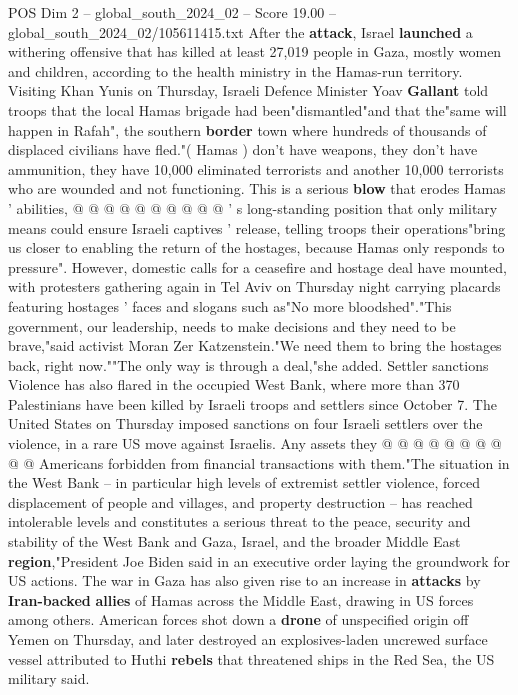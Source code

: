\begin{textsample}{POS Dim 2 – global\_south\_2024\_02 – Score 19.00 – global\_south\_2024\_02/105611415.txt}
After the \textbf{attack}, Israel \textbf{launched} a withering offensive that has killed at least 27,019 people in Gaza, mostly women and children, according to the health ministry in the Hamas-run territory.
Visiting Khan Yunis on Thursday, Israeli Defence Minister Yoav \textbf{Gallant} told troops that the local Hamas brigade had been"dismantled"and that the"same will happen in Rafah", the southern \textbf{border} town where hundreds of thousands of displaced civilians have fled."( Hamas ) don't have weapons, they don't have ammunition, they have 10,000 eliminated terrorists and another 10,000 terrorists who are wounded and not functioning.
This is a serious \textbf{blow} that erodes Hamas ' abilities, @ @ @ @ @ @ @ @ @ @ ' s long-standing position that only military means could ensure Israeli captives ' release, telling troops their operations"bring us closer to enabling the return of the hostages, because Hamas only responds to pressure".
However, domestic calls for a ceasefire and hostage deal have mounted, with protesters gathering again in Tel Aviv on Thursday night carrying placards featuring hostages ' faces and slogans such as"No more bloodshed"."This government, our leadership, needs to make decisions and they need to be brave,"said activist Moran Zer Katzenstein."We need them to bring the hostages back, right now.""The only way is through a deal,"she added.
Settler sanctions Violence has also flared in the occupied West Bank, where more than 370 Palestinians have been killed by Israeli troops and settlers since October 7.
The United States on Thursday imposed sanctions on four Israeli settlers over the violence, in a rare US move against Israelis.
Any assets they @ @ @ @ @ @ @ @ @ @ Americans forbidden from financial transactions with them."The situation in the West Bank -- in particular high levels of extremist settler violence, forced displacement of people and villages, and property destruction -- has reached intolerable levels and constitutes a serious threat to the peace, security and stability of the West Bank and Gaza, Israel, and the broader Middle East \textbf{region},"President Joe Biden said in an executive order laying the groundwork for US actions.
The war in Gaza has also given rise to an increase in \textbf{attacks} by \textbf{Iran-backed} \textbf{allies} of Hamas across the Middle East, drawing in US forces among others.
American forces shot down a \textbf{drone} of unspecified origin off Yemen on Thursday, and later destroyed an explosives-laden uncrewed surface vessel attributed to Huthi \textbf{rebels} that threatened ships in the Red Sea, the US military said.

\end{textsample}
